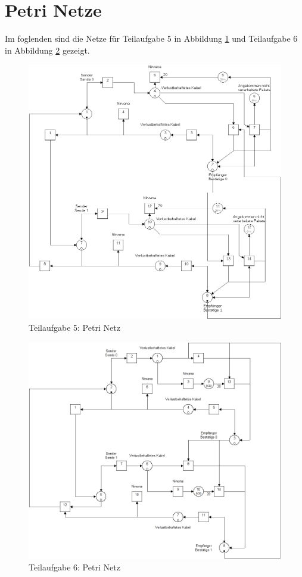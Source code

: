 \documentclass[10pt]{scrartcl}
\begin{document}
\section{Petri Netze}
	Im foglenden sind die Netze für Teilaufgabe 5 in Abbildung \ref{img:aufg5} und Teilaufgabe 6 in Abbildung \ref{img:aufg6} gezeigt.

	\begin{figure}[H]
                \includegraphics[width=\textwidth]{praktikum1-aufgabe5.png}
        \caption{Teilaufgabe 5: Petri Netz}
        \label{img:aufg5}
	\end{figure}


	\begin{figure}[H]
                \includegraphics[width=\textwidth]{praktikum1-aufgabe6.png}
        \caption{Teilaufgabe 6: Petri Netz}
        \label{img:aufg6}
	\end{figure}
\end{document}
